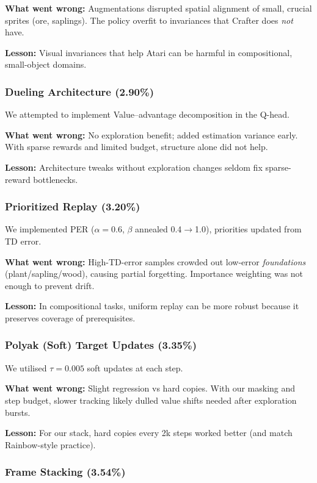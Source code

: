 \documentclass[conference]{IEEEtran}
\begin{document}
\textbf{What went wrong:} Augmentations disrupted spatial alignment of small, crucial sprites (ore, saplings). The policy overfit to invariances that Crafter does \emph{not} have.

\textbf{Lesson:} Visual invariances that help Atari can be harmful in compositional, small-object domains.

\subsubsection{Dueling Architecture (2.90\%)}

We attempted to implement Value–advantage decomposition in the Q-head.

\textbf{What went wrong:} No exploration benefit; added estimation variance early. With sparse rewards and limited budget, structure alone did not help.

\textbf{Lesson:} Architecture tweaks without exploration changes seldom fix sparse-reward bottlenecks.

\subsubsection{Prioritized Replay (3.20\%)}

We implemented PER ($\alpha{=}0.6$, $\beta$ annealed 0.4$\rightarrow$1.0), priorities updated from TD error.

\textbf{What went wrong:} High-TD-error samples crowded out low-error \emph{foundations} (plant/sapling/wood), causing partial forgetting. Importance weighting was not enough to prevent drift.

\textbf{Lesson:} In compositional tasks, uniform replay can be more robust because it preserves coverage of prerequisites.

\subsubsection{Polyak (Soft) Target Updates (3.35\%)}

We utilised $\tau{=}0.005$ soft updates at each step.

\textbf{What went wrong:} Slight regression vs hard copies. With our masking and step budget, slower tracking likely dulled value shifts needed after exploration bursts.

\textbf{Lesson:} For our stack, hard copies every 2k steps worked better (and match Rainbow-style practice).

\subsubsection{Frame Stacking (3.54\%)}
\end{document}
